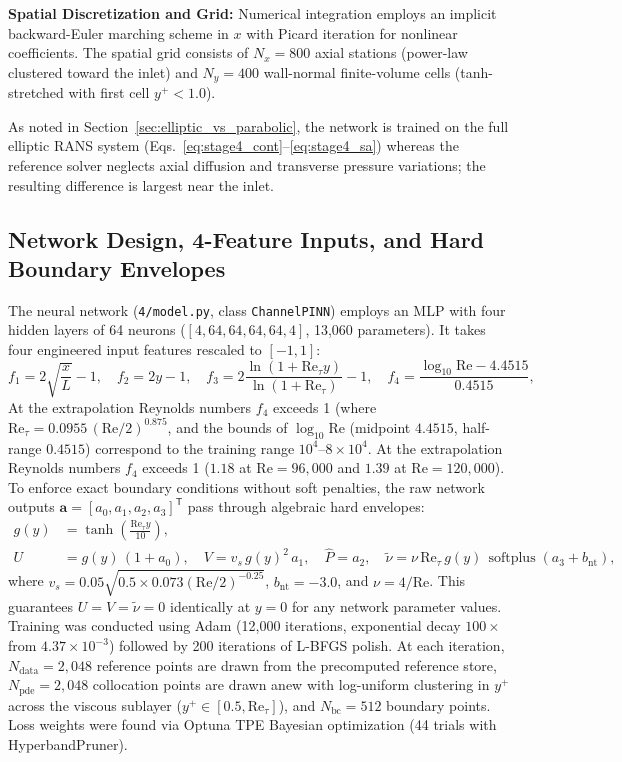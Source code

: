 \documentclass[11pt,a4paper]{article}
\begin{document}
\noindent\textbf{Spatial Discretization and Grid:} Numerical integration employs an implicit backward-Euler marching scheme in $x$ with Picard iteration for nonlinear coefficients. The spatial grid consists of $N_x = 800$ axial stations (power-law clustered toward the inlet) and $N_y = 400$ wall-normal finite-volume cells (tanh-stretched with first cell $y^+ < 1.0$).

As noted in Section~\ref{sec:elliptic_vs_parabolic}, the network is trained on the full elliptic RANS system (Eqs.~\eqref{eq:stage4_cont}--\eqref{eq:stage4_sa}) whereas the reference solver neglects axial diffusion and transverse pressure variations; the resulting difference is largest near the inlet.

\subsection{Network Design, 4-Feature Inputs, and Hard Boundary Envelopes}
The neural network (\texttt{4/model.py}, class \texttt{ChannelPINN}) employs an MLP with four hidden layers of 64 neurons ($[4, 64, 64, 64, 64, 4]$, 13,060 parameters). It takes four engineered input features rescaled to $[-1, 1]$:
\begin{equation}
f_1 = 2\sqrt{\frac{x}{L}} - 1, \quad f_2 = 2y - 1, \quad f_3 = 2\frac{\ln(1 + \mathrm{Re}_\tau y)}{\ln(1 + \mathrm{Re}_\tau)} - 1, \quad f_4 = \frac{\log_{10} \mathrm{Re} - 4.4515}{0.4515},
\end{equation}
At the extrapolation Reynolds numbers $f_4$ exceeds 1 (where $\mathrm{Re}_\tau=0.0955\,(\mathrm{Re}/2)^{0.875}$, and the bounds of $\log_{10}\mathrm{Re}$ (midpoint $4.4515$, half-range $0.4515$) correspond to the training range $10^4$--$8\times 10^4$. At the extrapolation Reynolds numbers $f_4$ exceeds 1 ($1.18$ at $\mathrm{Re} = 96{,}000$ and $1.39$ at $\mathrm{Re} = 120{,}000$). To enforce exact boundary conditions without soft penalties, the raw network outputs $\mathbf{a} = [a_0, a_1, a_2, a_3]^{\mathsf T}$ pass through algebraic hard envelopes:
\begin{align}
g(y) &= \tanh\left(\frac{\mathrm{Re}_\tau y}{10}\right), \\
U &= g(y)\,(1 + a_0), \quad V = v_s\,g(y)^2\,a_1, \quad \hat{P} = a_2, \quad \tilde{\nu} = \nu\,\mathrm{Re}_\tau\,g(y)\,\operatorname{softplus}(a_3 + b_{\mathrm{nt}}),
\end{align}
where $v_s = 0.05 \sqrt{0.5 \times 0.073 (\mathrm{Re}/2)^{-0.25}}$, $b_{\mathrm{nt}} = -3.0$, and $\nu = 4/\mathrm{Re}$. This guarantees $U=V=\tilde{\nu}=0$ identically at $y=0$ for any network parameter values.
Training was conducted using Adam (12,000 iterations, exponential decay $100\times$ from $4.37\times 10^{-3}$) followed by 200 iterations of L-BFGS polish. At each iteration, $N_{\mathrm{data}} = 2{,}048$ reference points are drawn from the precomputed reference store, $N_{\mathrm{pde}} = 2{,}048$ collocation points are drawn anew with log-uniform clustering in $y^+$ across the viscous sublayer ($y^+ \in [0.5, \mathrm{Re}_\tau]$), and $N_{\mathrm{bc}} = 512$ boundary points. Loss weights were found via Optuna TPE Bayesian optimization (44 trials with HyperbandPruner).
\end{document}
